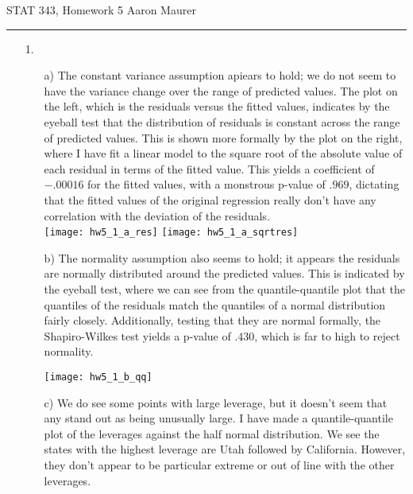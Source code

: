\documentclass[11pt]{article}
\theoremstyle{definition}
\begin{document}
STAT 343, Homework 5 \hfill Aaron Maurer
\vspace{2mm}
\hrule
\vspace{2mm}
\begin{itemize}
    \item[1.]
        \begin{itemize}
            \item[a)] 
                The constant variance assumption apiears to hold; we do not seem to have the variance change over the range of predicted values. The plot on the left, which is the residuals versus the fitted values, indicates by the eyeball test that the distribution of residuals is constant across the range of predicted values. This is shown more formally by the plot on the right, where I have fit a linear model to the square root of the absolute value of each residual in terms of the fitted value. This yields a coefficient of $-.00016$ for the fitted values, with a monstrous p-value of $.969$, dictating that the fitted values of the original regression really don't have any correlation with the deviation of the residuals. \\
                \texttt{[image: hw5\_1\_a\_res]} 
                \texttt{[image: hw5\_1\_a\_sqrtres]} 
            \item[b)]
                The normality assumption also seems to hold; it appears the residuals are normally distributed around the predicted values. This is indicated by the eyeball test, where we can see from the quantile-quantile plot that the quantiles of the residuals match the quantiles of a normal distribution fairly closely. Additionally, testing that they are normal formally, the Shapiro-Wilkes test yields a p-value of $.430$, which is far to high to reject normality.
                \begin{center}
                    \texttt{[image: hw5\_1\_b\_qq]} 
                \end{center}
            \item[c)]
                We do see some points with large leverage, but it doesn't seem that any stand out as being unusually large. I have made a quantile-quantile plot of the leverages against the half normal distribution. We see the states with the highest leverage are Utah followed by California. However, they don't appear to be particular extreme or out of line with the other leverages.

\end{itemize}
\end{itemize}
\end{document}
